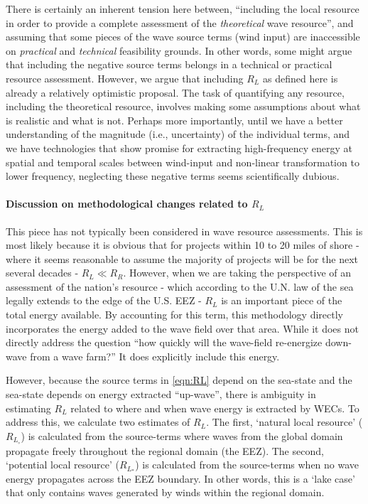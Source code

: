 There is certainly an inherent tension here between, ``including the local resource in order to provide a complete assessment of the {\em theoretical} wave resource'', and assuming that some pieces of the wave source terms (wind input) are inaccessible on {\em practical} and {\em technical} feasibility grounds. In other words, some might argue that including the negative source terms belongs in a technical or practical resource assessment. However, we argue that including $R_L$ as defined here is already a relatively optimistic proposal. 
The task of quantifying any resource, including the theoretical resource, involves making some assumptions about what is realistic and what is not. 
Perhaps more importantly, until we have a better understanding of the magnitude (i.e., uncertainty) of the individual terms, and we have technologies that show promise for extracting high-frequency energy at spatial and temporal scales between wind-input and non-linear transformation to lower frequency, neglecting these negative terms seems scientifically dubious.

\paragraph{Discussion on methodological changes related to $R_L$}

This piece has not typically been considered in wave resource assessments. This is most likely because it is obvious that for projects within 10 to 20 miles of shore - where it seems reasonable to assume the majority of projects will be for the next several decades - $R_L \ll R_R$. However, when we are taking the perspective of an assessment of the nation's resource - which according to the U.N. law of the sea legally extends to the edge of the U.S. EEZ - $R_L$ is an important piece of the total energy available. By accounting for this term, this methodology directly incorporates the energy added to the wave field over that area. While it does not directly address the question ``how quickly will the wave-field re-energize down-wave from a wave farm?'' It does explicitly include this energy.

However, because the source terms in \eqref{eqn:RL} depend on the sea-state and the sea-state depends on energy extracted ``up-wave'', there is ambiguity in estimating $R_L$ related to where and when wave energy is extracted by WECs. To address this, we calculate two estimates of $R_L$. The first, `natural local resource' ($R_{L_\circ}$) is calculated from the source-terms where waves from the global domain propagate freely throughout the regional domain (the EEZ). The second, `potential local resource' ($R_{L_*}$) is calculated from the source-terms when no wave energy propagates across the EEZ boundary. In other words, this is a `lake case' that only contains waves generated by winds within the regional domain.

